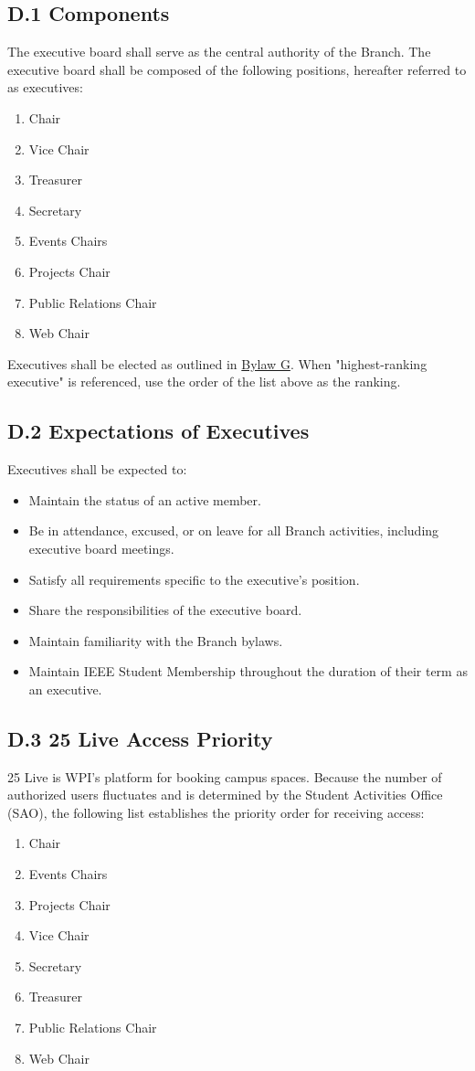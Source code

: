 \documentclass[11pt,a4paper]{article}
\begin{document}
\subsection*{D.1 Components}
The executive board shall serve as the central authority of the Branch. The executive board shall be composed of the following positions, hereafter referred to as executives:
\begin{enumerate}[noitemsep]
    \item Chair
    \item Vice Chair
    \item Treasurer
    \item Secretary
    \item Events Chairs
    \item Projects Chair
    \item Public Relations Chair
    \item Web Chair
\end{enumerate}
Executives shall be elected as outlined in \hyperref[G]{Bylaw G}.
When "highest-ranking executive" is referenced, use the order of the list above as the ranking.

\subsection*{D.2 Expectations of Executives}
Executives shall be expected to:
\begin{itemize}[noitemsep]
    \item Maintain the status of an active member.
    \item Be in attendance, excused, or on leave for all Branch activities, including executive board meetings.
    \item Satisfy all requirements specific to the executive's position.
    \item Share the responsibilities of the executive board.
    \item Maintain familiarity with the Branch bylaws.
    \item Maintain IEEE Student Membership throughout the duration of their term as an executive.
\end{itemize}


\subsection*{D.3 25 Live Access Priority}
25 Live is WPI’s platform for booking campus spaces. Because the number of authorized users fluctuates and is determined by the Student Activities Office (SAO), the following list establishes the priority order for receiving access:
\begin{enumerate}[noitemsep]
    \item Chair
    \item Events Chairs
    \item Projects Chair
    \item Vice Chair
    \item Secretary
    \item Treasurer
    \item Public Relations Chair
    \item Web Chair
\end{enumerate}
\end{document}

